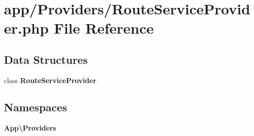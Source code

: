 \section{app/\+Providers/\+Route\+Service\+Provider.php File Reference}
\label{app_2_providers_2_route_service_provider_8php}
\subsection*{Data Structures}
\begin{DoxyCompactItemize}
\item 
class {\bf Route\+Service\+Provider}
\end{DoxyCompactItemize}
\subsection*{Namespaces}
\begin{DoxyCompactItemize}
\item 
 {\bf App\textbackslash{}\+Providers}
\end{DoxyCompactItemize}
